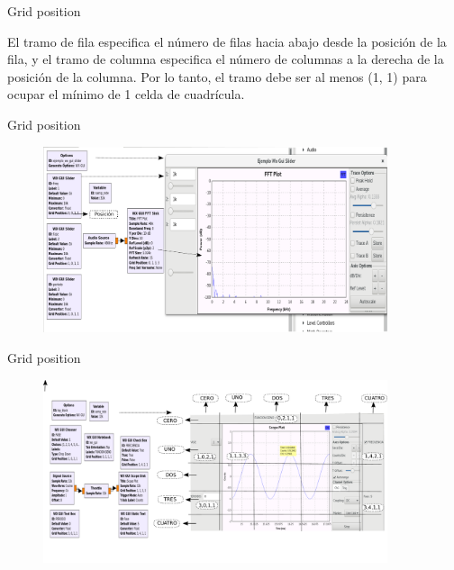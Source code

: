 \begin{frame}{Grid position}

El tramo de fila especifica el número de filas hacia abajo desde la posición de la fila, y el tramo de columna especifica el número de columnas a la derecha de la posición de la columna. Por lo tanto, el tramo debe ser al menos (1, 1) para ocupar el mínimo de 1 celda de cuadrícula.

\end{frame}

\begin{frame}{Grid position}

\begin{figure}[H]
\centering
\vspace{-3mm}
\includegraphics[width=0.9\textwidth]{parte1/lab00/pdf/lab0_2.pdf}
\end{figure}

\end{frame}

\begin{frame}{Grid position}

\begin{figure}[H]
\centering
\vspace{-3mm}
\includegraphics[width=0.9\textwidth]{parte1/lab00/pdf/lab0_3.pdf}
\end{figure}

\end{frame}
